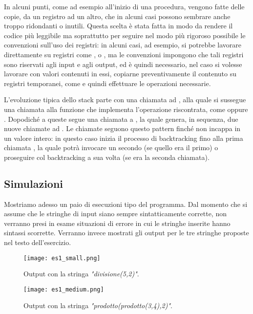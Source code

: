 		In alcuni punti, come ad esempio all'inizio di una procedura, vengono fatte delle copie, da un registro ad un altro, che in alcuni casi possono sembrare anche troppo ridondanti o inutili. Questa scelta è stata fatta in modo da rendere il codice più leggibile ma soprattutto per seguire nel modo più rigoroso possibile le convenzioni sull'uso dei registri: in alcuni casi, ad esempio, si potrebbe lavorare direttamente su registri come ,  o , ma le convenzioni impongono che tali registri sono riservati agli input e agli output, ed è quindi necessario, nel caso si volesse lavorare con valori contenuti in essi, copiarne preventivamente il contenuto su registri temporanei, come  e quindi effettuare le operazioni necessarie.
		
		L'evoluzione tipica dello stack parte con una chiamata ad , alla quale si sussegue una chiamata alla funzione che implementa l'operazione riscontrata, come  oppure . Dopodiché a queste segue una chiamata a , la quale genera, in sequenza, due nuove chiamate ad . Le chiamate seguono questo pattern finché  non incappa in un valore intero: in questo caso inizia il processo di backtracking fino alla prima chiamata , la quale potrà invocare un secondo  (se quello era il primo) o proseguire col backtracking a sua volta (se era la seconda chiamata).
		
	\subsection*{Simulazioni}
		Mostriamo adesso un paio di esecuzioni tipo del programma. Dal momento che si assume che le stringhe di input siano sempre sintatticamente corrette, non verranno presi in esame situazioni di errore in cui le stringhe inserite hanno sintassi scorrette. Verranno invece mostrati gli output per le tre stringhe proposte nel testo dell'esercizio.
		
       	\begin{figure}[h!]
       		\begin{center}
       			\texttt{[image: es1\_small.png]}
       		\end{center}
       		\caption{Output con la stringa \textit{"divisione(5,2)"}.}
       		\label{fig:es1_small}
       	\end{figure}
       	
       	\begin{figure}[h!]
       		\begin{center}
       			\texttt{[image: es1\_medium.png]}
       		\end{center}
       		\caption{Output con la stringa \textit{"prodotto(prodotto(3,4),2)"}.}
       		\label{fig:es1_medium}
       	\end{figure}
       	
